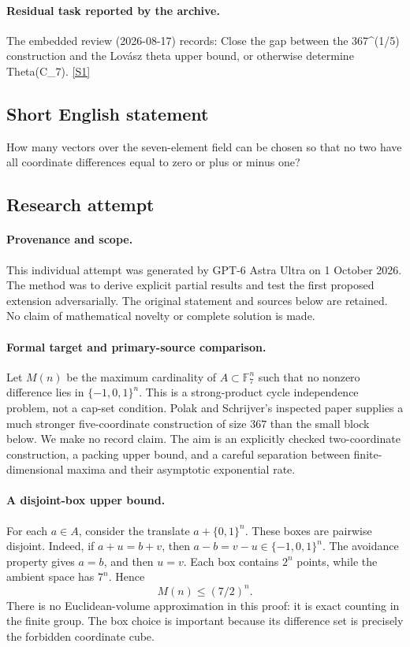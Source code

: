 \documentclass[11pt,a4paper]{article}
\newcommand{\F}{\mathbb{F}}
\newcommand{\sref}[2]{\hyperlink{source:#1:#2}{[S#2]}}
\begin{document}
\paragraph{Residual task reported by the archive.}

The embedded review (2026-08-17) records: Close the gap between the 367\textasciicircum{}(1/5) construction and the Lovász theta upper bound, or otherwise determine Theta(C\_7). \sref{168}{1}

\subsection{Short English statement}

How many vectors over the seven-element field can be chosen so that no two have all coordinate differences equal to zero or plus or minus one?

\subsection{Research attempt}

\paragraph{Provenance and scope.}
This individual attempt was generated by GPT-6 Astra Ultra on 1 October 2026. The method was to derive explicit partial results and test the first proposed extension adversarially. The original statement and sources below are retained. No claim of mathematical novelty or complete solution is made.

\paragraph{Formal target and primary-source comparison.}
Let $M(n)$ be the maximum cardinality of $A\subset\F_7^n$ such that no nonzero difference lies in $\{-1,0,1\}^n$. This is a strong-product cycle independence problem, not a cap-set condition. Polak and Schrijver's inspected paper supplies a much stronger five-coordinate construction of size $367$ than the small block below. We make no record claim. The aim is an explicitly checked two-coordinate construction, a packing upper bound, and a careful separation between finite-dimensional maxima and their asymptotic exponential rate.

\paragraph{A disjoint-box upper bound.}
For each $a\in A$, consider the translate $a+\{0,1\}^n$. These boxes are pairwise disjoint. Indeed, if $a+u=b+v$, then $a-b=v-u\in\{-1,0,1\}^n$. The avoidance property gives $a=b$, and then $u=v$. Each box contains $2^n$ points, while the ambient space has $7^n$. Hence
\[
 M(n)\leq(7/2)^n.
\]
There is no Euclidean-volume approximation in this proof: it is exact counting in the finite group. The box choice is important because its difference set is precisely the forbidden coordinate cube.
\end{document}
